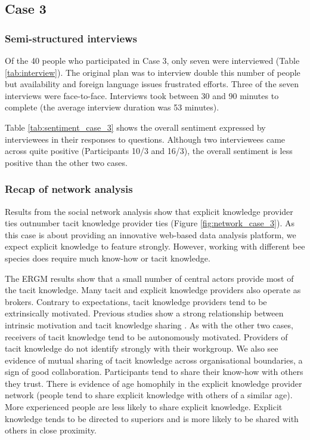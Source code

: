 \subsection{Case 3}

\subsubsection{Semi-structured interviews}

Of the 40 people who participated in Case 3, only seven were interviewed (Table \ref{tab:interview}). The original plan was to interview double this number of people but availability and foreign language issues frustrated efforts. Three of the seven interviews were face-to-face. Interviews took between 30 and 90 minutes to complete (the average interview duration was 53 minutes). \medskip

Table \ref{tab:sentiment_case_3} shows the overall sentiment expressed by interviewees in their responses to questions. Although two interviewees came across quite positive (Participants 10/3 and 16/3), the overall sentiment is less positive than the other two cases.

\subsubsection{Recap of network analysis}

Results from the social network analysis show that explicit knowledge provider ties outnumber tacit knowledge provider ties (Figure \ref{fig:network_case_3}). As this case is about providing an innovative web-based data analysis platform, we expect explicit knowledge to feature strongly. However, working with different bee species does require much know-how or tacit knowledge. \medskip

The ERGM results show that a small number of central actors provide most of the tacit knowledge. Many tacit and explicit knowledge providers also operate as brokers. Contrary to expectations, tacit knowledge providers tend to be extrinsically motivated. Previous studies show a strong relationship between intrinsic motivation and tacit knowledge sharing \citep[e.g.][]{osterloh2000motivation,kaser2001knowledge,hau2013effects,shao2017charismatic}. As with the other two cases, receivers of tacit knowledge tend to be autonomously motivated. Providers of tacit knowledge do not identify strongly with their workgroup. We also see evidence of mutual sharing of tacit knowledge across organisational boundaries, a sign of good collaboration. Participants tend to share their know-how with others they trust. There is evidence of age homophily in the explicit knowledge provider network (people tend to share explicit knowledge with others of a similar age). More experienced people are less likely to share explicit knowledge. Explicit knowledge tends to be directed to superiors and is more likely to be shared with others in close proximity. \medskip

